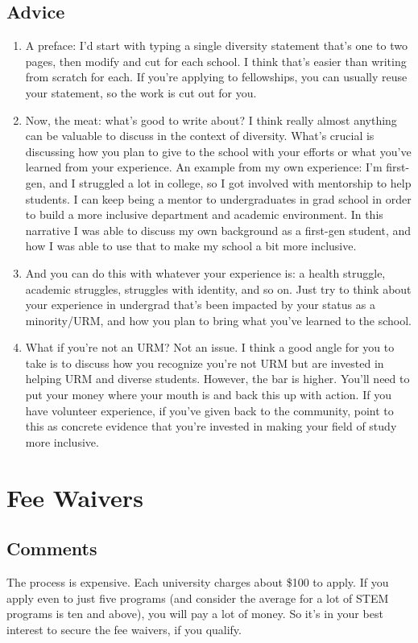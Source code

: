 \documentclass[12pt]{article}
\begin{document}
\subsection{Advice}
\begin{enumerate}
\item A preface: I’d start with typing a single diversity statement that’s one to two pages, then modify and cut for each school. I think that’s easier than writing from scratch for each. If you’re applying to fellowships, you can usually reuse your statement, so the work is cut out for you.


\item Now, the meat: what’s good to write about? I think really almost anything can be valuable to discuss in the context of diversity. What’s crucial is discussing how you plan to give to the school with your efforts or what you’ve learned from your experience. An example from my own experience: I’m first-gen, and I struggled a lot in college, so I got involved with mentorship to help students. I can keep being a mentor to undergraduates in grad school in order to build a more inclusive department and academic environment. In this narrative I was able to discuss my own background as a first-gen student, and how I was able to use that to make my school a bit more inclusive. 

\item And you can do this with whatever your experience is: a health struggle, academic struggles, struggles with identity, and so on. Just try to think about your experience in undergrad that’s been impacted by your status as a minority/URM, and how you plan to bring what you’ve learned to the school.

\item  What if you’re not an URM? Not an issue. I think a good angle for you to take is to discuss how you recognize you’re not URM but are invested in helping URM and diverse students. However, the bar is higher. You’ll need to put your money where your mouth is and back this up with action. If you have volunteer experience, if you’ve given back to the community, point to this as concrete evidence that you’re invested in making your field of study more inclusive. 
\end{enumerate}

\section{Fee Waivers}
\subsection{Comments}
The process is expensive. Each university charges about \$100 to apply. If you apply even to just five programs (and consider the average for a lot of STEM programs is ten and above), you will pay a lot of money. So it’s in your best interest to secure the fee waivers, if you qualify.
\end{document}
